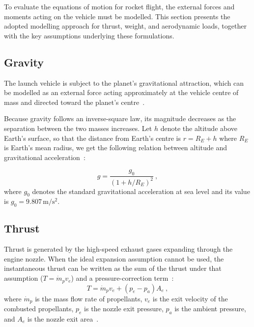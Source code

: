 To evaluate the equations of motion for rocket flight, the external forces and moments acting on the vehicle must be modelled. This section presents the adopted modelling approach for thrust, weight, and aerodynamic loads, together with the key assumptions underlying these formulations.


\subsection{Gravity}

The launch vehicle is subject to the planet's gravitational attraction, which can be modelled as an external force acting approximately at the vehicle centre of mass and directed toward the planet's centre~\cite{curtis2020orbital}.

Because gravity follows an inverse-square law, its magnitude decreases as the separation between the two masses increases. Let $h$ denote the altitude above Earth's surface, so that the distance from Earth's centre is $r = R_E + h$ where $R_E$ is Earth's mean radius, we get the following relation between altitude and gravitational acceleration~\cite{curtis2020orbital}:

\begin{equation}
g = \frac{g_0}{\left(1 + h/R_E\right)^2} \ ,
\end{equation}
where $g_0$ denotes the standard gravitational acceleration at sea level and its value is $g_0 = 9.807\,\mathrm{m/s^2}$.


\subsection{Thrust}

Thrust is generated by the high-speed exhaust gases expanding through the engine nozzle. When the ideal expansion assumption cannot be used, the instantaneous thrust can be written as the sum of the thrust under that assumption ($T = \dot m_p v_e$) and a pressure-correction term~\cite{Edberg}: 
\begin{equation}
T = \dot m_p v_e + \left(p_e - p_a\right)A_e \ ,
\end{equation}
where $\dot m_p$ is the mass flow rate of propellants, $v_e$ is the exit velocity of the combusted propellants, $p_e$ is the nozzle exit pressure, $p_a$ is the ambient pressure, and $A_e$ is the nozzle exit area~\cite{Edberg, sutton2017rocket}.


